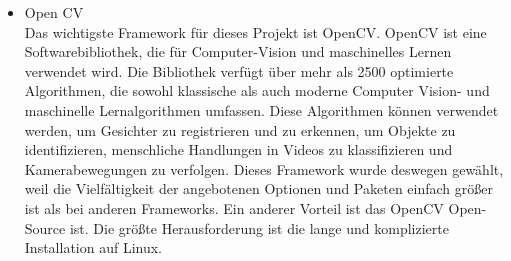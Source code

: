 	\begin{itemize}
		\item Open CV \\
		Das wichtigste Framework für dieses Projekt ist OpenCV. OpenCV ist eine Softwarebibliothek, die für Computer-Vision und maschinelles Lernen verwendet wird. Die Bibliothek verfügt über mehr als 2500 optimierte Algorithmen, die sowohl klassische als auch moderne Computer Vision- und maschinelle Lernalgorithmen umfassen. Diese Algorithmen können verwendet werden, um Gesichter zu registrieren und zu erkennen, um Objekte zu identifizieren, menschliche Handlungen in Videos zu klassifizieren und Kamerabewegungen zu verfolgen. Dieses Framework wurde deswegen gewählt, weil die Vielfältigkeit der angebotenen Optionen und Paketen einfach größer ist als bei anderen Frameworks. Ein anderer Vorteil ist das OpenCV Open-Source ist. Die größte Herausforderung ist die lange und komplizierte Installation auf Linux.
		\cite{OpenCVR}

\end{itemize}
